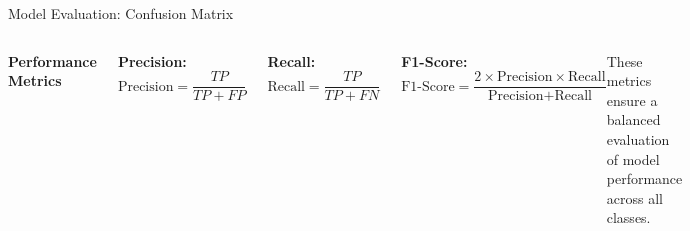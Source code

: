 \begin{frame}{Model Evaluation: Confusion Matrix}

    \begin{columns}

        \textbf{Performance Metrics}
        \vspace{10pt}
        
        \textbf{Precision:} 
        \[
        \text{Precision} = \frac{TP}{TP + FP}
        \]
        
        \textbf{Recall:} 
        \[
        \text{Recall} = \frac{TP}{TP + FN}
        \]

        \textbf{F1-Score:}
        \[
        \text{F1-Score} = \frac{2 \times \text{Precision} \times \text{Recall}}{\text{Precision} + \text{Recall}}
        \]

        \vspace{5pt}
        These metrics ensure a balanced evaluation of model performance across all classes.

        \centering
        \includegraphics[width=0.9\linewidth]{figures/confusion matrix samples.png} %

    \end{columns}

\end{frame}




